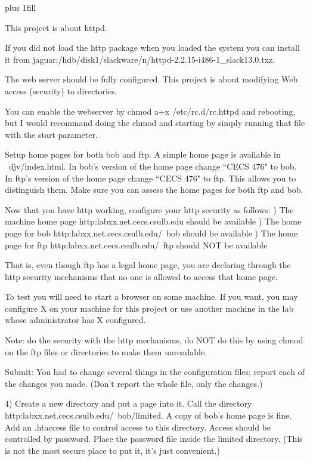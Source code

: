 
\rightskip=0pt plus 1fill

\parindent 0pt

This project is about httpd.

If you did not load the http package when you loaded the system you can
install it from
{\ltt{}jaguar:/hdb/disk1/slackware/n/httpd-2.2.15-i486-1_slack13.0.txz}.

The web server should be fully configured.
This project is about modifying Web access (security) to
directories.

You can enable the webserver by 
{\ltt{}chmod a+x /etc/rc.d/rc.httpd}
and rebooting,
but I would recommand doing the {\ltt{}chmod} and starting by simply
running that file with the {\ltt{}start} parameter.

Setup home pages for both bob and ftp.
A simple home page is available in {\ltt{}~djv/index.html}.
In bob's version of the home page change ``CECS 476" to bob.
In ftp's version of the home page change ``CECS 476" to ftp.
This allows you to distinguish them.
Make sure you can assess the home pages for both ftp and bob.

Now that you have http working,
configure your http security as follows:
\hfill{}) The machine home page {\ltt{}http:labxx.net.cecs.csulb.edu}
should be available
\hfill{}) The home page for bob {\ltt{}http:labxx.net.cecs.csulb.edu/~bob}
should be available
\hfill{}) The home page for ftp {\ltt{}http:labxx.net.cecs.csulb.edu/~ftp}
should NOT be available

That is, even though ftp has a legal home page, you are declaring
through the http security mechanisms that no one is allowed to
access that home page.

To test you will need to start a browser on some machine. 
If you want, you may configure X on your machine for this project or use 
another machine in the lab whose administrator has X configured.

Note: do the security with the http mechanisms, do NOT do
this by using
{\ltt{}chmod} on the ftp files or directories to make them unreadable.

Submit: 
You had to change several things in the configuration files;
report each of the changes you made.
(Don't report the whole file, only the changes.)

4) Create a new directory and put a page into it.
Call the directory
{\ltt{}http:labxx.net.cecs.csulb.edu/~bob/limited}.
A copy of bob's home page is fine.
Add an {\ltt{}.htaccess} file to control access to this directory.
Access should be controlled by password.
Place the password file inside the {\ltt{}limited} directory.
(This is not the most secure place to put it, it's just convenient.)

